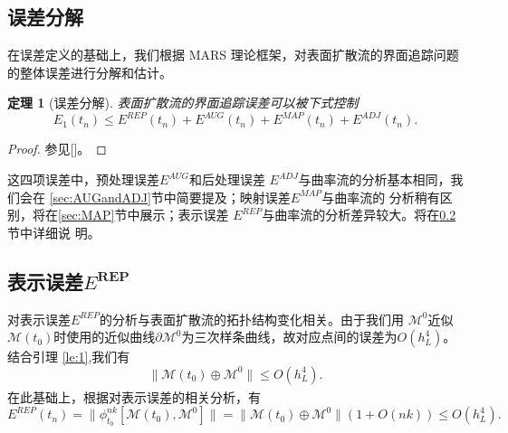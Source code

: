 \documentclass[a4paper,twoside]{ctexart}
\newtheorem{theorem}{定理}[section]
\begin{document}
\subsection{误差分解}
\label{sec:decom}
在误差定义的基础上，我们根据 MARS 理论框架，对表面扩散流的界面追踪问题
的整体误差进行分解和估计。
\begin{theorem}[误差分解]
  表面扩散流的界面追踪误差可以被下式控制
  \begin{equation}
    \label{eq:errordes}
    E_1(t_n) \le E^{REP}(t_n) + E^{AUG}(t_n) +
    E^{MAP}(t_n) + E^{ADJ}(t_n).
  \end{equation}
\end{theorem}
\begin{proof}
  参见[\cite{ref7}]。
  \end{proof}
\indent 这四项误差中，预处理误差$E^{AUG}$和后处理误差
  $E^{ADJ}$与曲率流的分析基本相同，我们会在
  \ref{sec:AUGandADJ}节中简要提及；映射误差$E^{MAP}$与曲率流的
  分析稍有区别，将在\ref{sec:MAP}节中展示；表示误差
  $E^{REP}$与曲率流的分析差异较大。将在\ref{sec:REP}节中详细说
  明。
  
\subsection{表示误差$E^{\textbf{REP}}$}
\label{sec:REP}
对表示误差$E^{REP}$的分析与表面扩散流的拓扑结构变化相关。由于我们用
$\mathcal{M}^0$近似$\mathcal{M}(t_0)$时使用的近似曲线$\partial
\mathcal{M}^0$为三次样条曲线，故对应点间的误差为$O(h_L^4)$。结合引理
\ref{le:1},我们有
\begin{equation}
  \label{eq:initcontrol}
  \| \mathcal{M}(t_0) \oplus \mathcal{M}^0\| \le O(h_L^4).
\end{equation}
在此基础上，根据对表示误差的相关分析\textsuperscript{\cite{ref7}}，有
\begin{equation}
  \label{eq:calREP}
  E^{REP}(t_n) = \|\phi_{t_0}^{nk}[\mathcal{M}(t_0),\mathcal{M}^0]\|
  = \| \mathcal{M}(t_0) \oplus \mathcal{M}^0\| (1 + O(nk)) \le O(h_L^4).
\end{equation}
\end{document}

